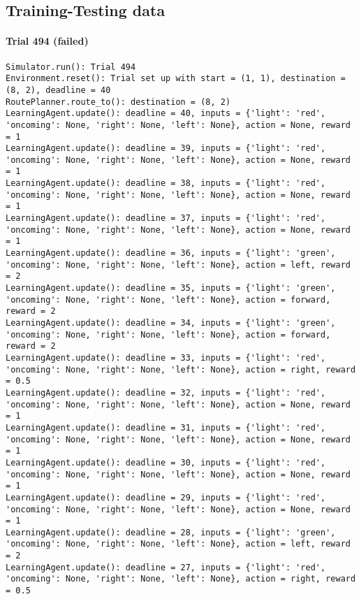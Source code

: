 \documentclass{article}
\begin{document}
\subsection{Training-Testing data}\label{training-testing-data}

\paragraph{Trial 494 (failed)}\label{trial-494-failed}

\begin{verbatim}
Simulator.run(): Trial 494
Environment.reset(): Trial set up with start = (1, 1), destination = (8, 2), deadline = 40
RoutePlanner.route_to(): destination = (8, 2)
LearningAgent.update(): deadline = 40, inputs = {'light': 'red', 'oncoming': None, 'right': None, 'left': None}, action = None, reward = 1
LearningAgent.update(): deadline = 39, inputs = {'light': 'red', 'oncoming': None, 'right': None, 'left': None}, action = None, reward = 1
LearningAgent.update(): deadline = 38, inputs = {'light': 'red', 'oncoming': None, 'right': None, 'left': None}, action = None, reward = 1
LearningAgent.update(): deadline = 37, inputs = {'light': 'red', 'oncoming': None, 'right': None, 'left': None}, action = None, reward = 1
LearningAgent.update(): deadline = 36, inputs = {'light': 'green', 'oncoming': None, 'right': None, 'left': None}, action = left, reward = 2
LearningAgent.update(): deadline = 35, inputs = {'light': 'green', 'oncoming': None, 'right': None, 'left': None}, action = forward, reward = 2
LearningAgent.update(): deadline = 34, inputs = {'light': 'green', 'oncoming': None, 'right': None, 'left': None}, action = forward, reward = 2
LearningAgent.update(): deadline = 33, inputs = {'light': 'red', 'oncoming': None, 'right': None, 'left': None}, action = right, reward = 0.5
LearningAgent.update(): deadline = 32, inputs = {'light': 'red', 'oncoming': None, 'right': None, 'left': None}, action = None, reward = 1
LearningAgent.update(): deadline = 31, inputs = {'light': 'red', 'oncoming': None, 'right': None, 'left': None}, action = None, reward = 1
LearningAgent.update(): deadline = 30, inputs = {'light': 'red', 'oncoming': None, 'right': None, 'left': None}, action = None, reward = 1
LearningAgent.update(): deadline = 29, inputs = {'light': 'red', 'oncoming': None, 'right': None, 'left': None}, action = None, reward = 1
LearningAgent.update(): deadline = 28, inputs = {'light': 'green', 'oncoming': None, 'right': None, 'left': None}, action = left, reward = 2
LearningAgent.update(): deadline = 27, inputs = {'light': 'red', 'oncoming': None, 'right': None, 'left': None}, action = right, reward = 0.5

\end{verbatim}
\end{document}
